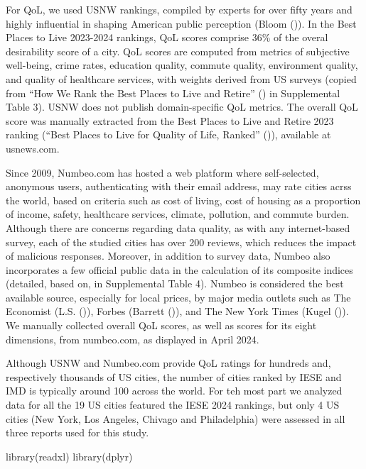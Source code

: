 \documentclass[
  english,
  12pt,
  a4paper,
]{scrartcl}
\newenvironment{Shaded}{\begin{snugshade}}{\end{snugshade}}
\newcommand{\FunctionTok}[1]{\textcolor[rgb]{0.28,0.35,0.67}{#1}}
\newcommand{\NormalTok}[1]{\textcolor[rgb]{0.00,0.23,0.31}{#1}}
\begin{document}
For QoL, we used USNW rankings, compiled by experts for over fifty years
and highly influential in shaping American public perception (Bloom
()). In the Best Places to
Live 2023-2024 rankings, QoL scores comprise 36\% of the overal
desirability score of a city. QoL scores are computed from metrics of
subjective well-being, crime rates, education quality, commute quality,
environment quality, and quality of healthcare services, with weights
derived from US surveys (copied from {``How We Rank the {Best Places to
Live and Retire}''} () in Supplemental
Table 3). USNW does not publish domain-specific QoL metrics. The overall
QoL score was manually extracted from the Best Places to Live and Retire
2023 ranking ({``Best {Places to Live} for Quality of Life, Ranked''}
()), available at usnews.com.

Since 2009, Numbeo.com has hosted a web platform where self-selected,
anonymous users, authenticating with their email address, may rate
cities acrss the world, based on criteria such as cost of living, cost
of housing as a proportion of income, safety, healthcare services,
climate, pollution, and commute burden. Although there are concerns
regarding data quality, as with any internet-based survey, each of the
studied cities has over 200 reviews, which reduces the impact of
malicious responses. Moreover, in addition to survey data, Numbeo also
incorporates a few official public data in the calculation of its
composite indices (detailed, based on, in Supplemental Table 4). Numbeo
is considered the best available source, especially for local prices, by
major media outlets such as The Economist (L.S.
()), Forbes (Barrett
()), and The New
York Times (Kugel ()). We
manually collected overall QoL scores, as well as scores for its eight
dimensions, from numbeo.com, as displayed in April 2024.

Although USNW and Numbeo.com provide QoL ratings for hundreds and,
respectively thousands of US cities, the number of cities ranked by IESE
and IMD is typically around 100 across the world. For teh most part we
analyzed data for all the 19 US cities featured the IESE 2024 rankings,
but only 4 US cities (New York, Los Angeles, Chivago and Philadelphia)
were assessed in all three reports used for this study.

\begin{Shaded}
\begin{Highlighting}[]
\FunctionTok{library}\NormalTok{(readxl)}
\FunctionTok{library}\NormalTok{(dplyr)}
\end{Highlighting}
\end{Shaded}
\end{document}
